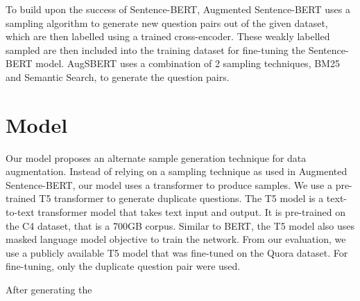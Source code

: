 \documentclass[11pt, oneside]{article}   	%
\begin{document}
To build upon the success of Sentence-BERT, Augmented Sentence-BERT uses a sampling algorithm to generate new question pairs out of the given dataset, which are then labelled using a trained cross-encoder. These weakly labelled sampled are then included into the training dataset for fine-tuning the Sentence-BERT model. AugSBERT uses a combination of 2 sampling techniques, BM25 and Semantic Search, to generate the question pairs. 


\section{Model}


Our model proposes an alternate sample generation technique for data augmentation. Instead of relying on a sampling technique as used in Augmented Sentence-BERT, our model uses a transformer to produce samples. We use a pre-trained T5 transformer to generate duplicate questions. The T5 model is a text-to-text transformer model that takes text input and output. It is pre-trained on the C4 dataset, that is a 700GB corpus. Similar to BERT, the T5 model also uses masked language model objective to train the network. From our evaluation, we use a publicly available T5 model that was fine-tuned on the Quora dataset. For fine-tuning, only the duplicate question pair were used. 

After generating the 
\end{document}
